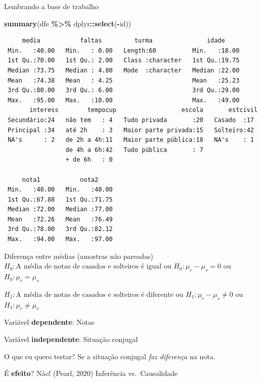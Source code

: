 \documentclass[
  9pt,
  ignorenonframetext,
  aspectratio=169]{beamer}
\newenvironment{Shaded}{\begin{snugshade}}{\end{snugshade}}
\newcommand{\KeywordTok}[1]{\textcolor[rgb]{0.13,0.29,0.53}{\textbf{#1}}}
\newcommand{\NormalTok}[1]{#1}
\newcommand{\OperatorTok}[1]{\textcolor[rgb]{0.81,0.36,0.00}{\textbf{#1}}}
\newcommand{\StringTok}[1]{\textcolor[rgb]{0.31,0.60,0.02}{#1}}
\begin{document}
\begin{frame}[fragile]{Lembrando a base de trabalho}
\protect\hypertarget{lembrando-a-base-de-trabalho}{}
\begin{Shaded}
\begin{Highlighting}[]
\KeywordTok{summary}\NormalTok{(dfe }\OperatorTok{\%\textgreater{}\%}\StringTok{ }\NormalTok{dplyr}\OperatorTok{::}\KeywordTok{select}\NormalTok{(}\OperatorTok{{-}}\NormalTok{id))}
\end{Highlighting}
\end{Shaded}

\begin{verbatim}
     media           faltas         turma               idade      
 Min.   :40.00   Min.   : 0.00   Length:60          Min.   :18.00  
 1st Qu.:70.00   1st Qu.: 2.00   Class :character   1st Qu.:19.75  
 Median :73.75   Median : 4.00   Mode  :character   Median :22.00  
 Mean   :74.38   Mean   : 4.25                      Mean   :25.23  
 3rd Qu.:80.00   3rd Qu.: 6.00                      3rd Qu.:29.00  
 Max.   :95.00   Max.   :10.00                      Max.   :49.00  
       interess        tempocup                  escola       estcivil 
 Secundário:24   não tem   : 4   Tudo privada       :20   Casado  :17  
 Principal :34   até 2h    : 3   Maior parte privada:15   Solteiro:42  
 NA's      : 2   de 2h a 4h:11   Maior parte pública:18   NA's    : 1  
                 de 4h a 6h:42   Tudo pública       : 7                
                 + de 6h   : 0                                         
                                                                       
     nota1           nota2      
 Min.   :40.00   Min.   :40.00  
 1st Qu.:67.88   1st Qu.:71.75  
 Median :72.00   Median :77.00  
 Mean   :72.26   Mean   :76.49  
 3rd Qu.:78.00   3rd Qu.:82.12  
 Max.   :94.00   Max.   :97.00  
\end{verbatim}
\end{frame}

\begin{frame}{Diferença entre médias (amostras não pareadas)}
\protect\hypertarget{diferenuxe7a-entre-muxe9dias-amostras-nuxe3o-pareadas}{}
\(H_0:\text{A média de notas de casados e solteiros é igual}\) ou
\(H_0:\mu_c-\mu_s=0\) ou \(H_0:\mu_c = \mu_s\)

\(H_1:\text{A média de notas de casados e solteiros é diferente}\) ou
\(H_1:\mu_c-\mu_s \neq 0\) ou \(H_1:\mu_c \neq \mu_s\)

Variável \textbf{dependente}: Notas

Variável \textbf{independente}: Situação conjugal

O que eu quero testar? Se a situação conjugal \emph{faz diferença} na
nota.

É \textbf{efeito}? Não! (Pearl, 2020) Inferência vs.~Causalidade
\end{frame}
\end{document}
